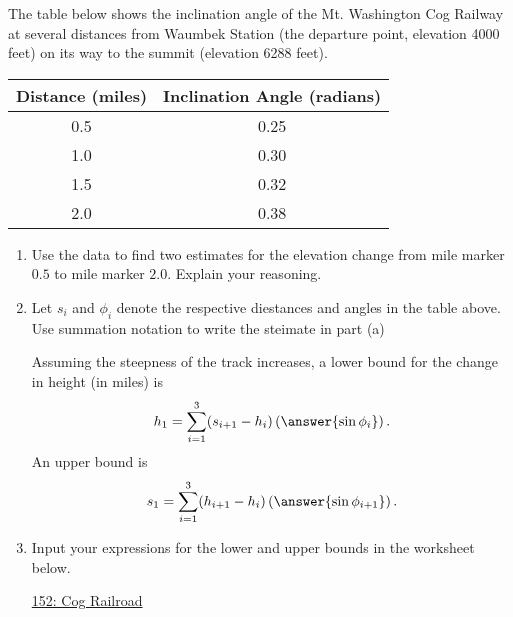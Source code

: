 \documentclass{ximera}
\begin{document}
\begin{exercise}  \label{EX:MnVWeDF3x}
The table below shows the inclination angle of the Mt. Washington Cog Railway at several distances from Waumbek Station (the departure point, elevation 4000 feet) on its way to the summit (elevation 6288 feet).

\begin{tabular}{|c|c|}
\hline
Distance (miles) & Inclination Angle (radians) \\
\hline
0.5 & 0.25 \\  \hline
1.0 & 0.30 \\ \hline
1.5 & 0.32 \\ \hline
2.0 & 0.38  \\ \hline
\hline
\end{tabular}


\begin{enumerate}
\item Use the data to find two estimates for the elevation change from mile marker $0.5$ to mile marker $2.0$. Explain your reasoning.

\item Let $s_i$ and $\phi_i$ denote the respective diestances and angles in the table above. Use summation notation to write the steimate in part (a)


Assuming the steepness of the track increases, a lower bound for the change in height (in miles) is
\[
    h_1 = \sum_{i=1}^3 (s_{i+1}-h_{i}) \left( \answer{\sin \phi_i} \right)  .
\]
An upper bound is
\[
    s_1 = \sum_{i=1}^3(h_{i+1}-h_{i}) \left( \answer{\sin \phi_{i+1}} \right)  .
\]

\item Input your expressions for the lower and upper bounds in the worksheet below.

\begin{onlineOnly}
    \begin{center}
\end{center}
\end{onlineOnly}

\href{https://www.desmos.com/calculator/ehnbprdu6q}{152: Cog Railroad}


\end{enumerate}
\end{exercise}
\end{document}
